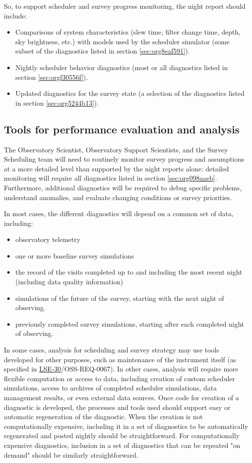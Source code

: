 So, to support scheduler and survey progress monitoring, the night report should include:
\begin{itemize}
\item Comparisons of system characteristics (slew time, filter change time, depth, sky brightness, etc.) with models used by the scheduler simulator (some subset of the diagnostics listed in section \ref{sec:org8eaf591}).
\item Nightly scheduler behavior diagnostics (most or all diagnostics listed in section \ref{sec:orgf30556f}).
\item Updated diagnostics for the survey state (a selection of the diagnostics listed in section \ref{sec:org5244b13}).
\end{itemize}

\subsection{Tools for performance evaluation and analysis}
\label{sec:org3504bfd}
The Observatory Scientist, Observatory Support Scientists, and the Survey Scheduling team will need to routinely monitor survey progress and assumptions at a more detailed level than supported by the night reports alone:
detailed monitoring will require all diagnostics listed in section \ref{sec:org098aaeb}.
Furthermore, additional diagnostics will be required to debug specific problems, understand anomalies, and evaluate changing conditions or survey priorities.

In most cases, the different diagnostics will depend on a common set of data, including:
\begin{itemize}
\item observatory telemetry
\item one or more baseline survey simulations
\item the record of the visits completed up to and including the most recent night (including data quality information)
\item simulations of the future of the survey, starting with the next night of observing.
\item previously completed survey simulations, starting after each completed night of observing.
\end{itemize}

In some cases, analysis for scheduling and survey strategy may use tools developed for other purposes, such as maintenance of the instrument itself (as specified in \href{https://ls.st/lse-30}{LSE-30}/OSS-REQ-0067).
In other cases, analysis will require more flexible computation or access to data, including creation of custom scheduler simulations, access to archives of completed scheduler simulations, data management results, or even external data sources.
Once code for creation of a diagnostic is developed, the processes and tools used should support easy or automatic regeneration of the diagnostic.
When the creation is not computationally expensive, including it in a set of diagnostics to be automatically regenerated and posted nightly should be straightforward.
For computationally expensive diagnostics, inclusion in a set of diagnostics that can be repeated "on demand" should be similarly straightforward.

